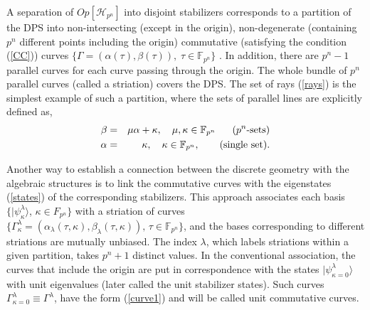 \documentclass{article}
\begin{document}
A separation of $Op[\mathcal{H}_{p^{n}}]$ into disjoint stabilizers
corresponds to a partition of the DPS into non-intersecting (except in the
origin), non-degenerate (containing $p^{n}$ different points including the
origin) commutative (satisfying the condition (\ref{CC})) curves $\{\Gamma
=\left( \alpha (\tau ),\beta (\tau )\right) ,\;\tau \in \mathbb{F}_{p^{n}}\}$
\cite{GS2,JPA09}. In addition, there are $p^{n}-1$ parallel curves for each
curve passing through the origin. The whole bundle of $p^{n}$ parallel
curves (called a striation) covers the DPS. The set of rays (\ref{rays}) is the
simplest example of such a partition, where the sets of parallel lines are
explicitly defined as, 
\begin{eqnarray}
  \beta &=& \mu \alpha + \kappa,
  \quad \mu,\kappa \in \mathbb{F}_{p^{n}}
  \quad \text{($p^{n}$-sets)}
  \label{rays0} \\
  \alpha &=& \kappa,
  \quad \kappa \in \mathbb{F}_{p^{n}},
  \quad \text{ (single set).} 
  \notag
\end{eqnarray}

Another way to establish a connection between the discrete geometry with the
algebraic structures is to link the commutative curves with the eigenstates
(\ref{states}) of the corresponding stabilizers. This approach associates each
basis $\{|\psi_{\kappa}^{\lambda}\rangle$, $\kappa \in F_{p^{n}}\}$ with a
striation of curves $\{\Gamma_{\kappa }^{\lambda } = \left(\alpha_{\lambda
}(\tau,\kappa ),\beta_{\lambda }(\tau,\kappa )\right), \, \tau \in
\mathbb{F}_{p^n}\}$, and the bases
corresponding to different striations are mutually unbiased. The index
$\lambda$, which labels striations within a given partition, takes $p^{n}+1$
distinct values. In the conventional association, the curves that include the
origin are put in correspondence with the states
$|\psi_{\kappa=0}^{\lambda}\rangle$ with unit eigenvalues (later called the
unit stabilizer states). Such curves $\Gamma_{\kappa=0}^{\lambda} \equiv
\Gamma^{\lambda}$, have the form (\ref{curve1}) and will be called unit
commutative curves.
\end{document}

